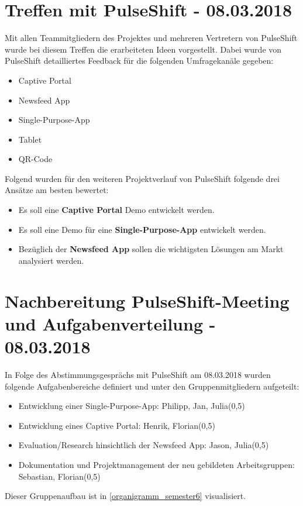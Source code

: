 \section{Treffen mit PulseShift - 08.03.2018}
\label{sec:events:definition_of_channels_for_poc}
Mit allen Teammitgliedern des Projektes und mehreren Vertretern von PulseShift wurde bei diesem Treffen die erarbeiteten Ideen vorgestellt. Dabei wurde von PulseShift detailliertes Feedback für die folgenden Umfragekanäle gegeben:
\begin{itemize}
\item Captive Portal
\item Newsfeed App
\item Single-Purpose-App
\item Tablet
\item QR-Code
\end{itemize}
Folgend wurden für den weiteren Projektverlauf von PulseShift folgende drei Ansätze am besten bewertet:
\begin{itemize}
\item Es soll eine \textbf{Captive Portal} Demo entwickelt werden.
\item Es soll eine Demo für eine \textbf{Single-Purpose-App} entwickelt werden.
\item Bezüglich der \textbf{Newsfeed App}  sollen die wichtigsten Lösungen am Markt analysiert werden.
\end{itemize}

\section{Nachbereitung PulseShift-Meeting und Aufgabenverteilung - 08.03.2018}
In Folge des Abstimmungsgesprächs mit PulseShift am 08.03.2018 wurden folgende Aufgabenbereiche definiert und unter den Gruppenmitgliedern aufgeteilt:
\begin{itemize}
\item Entwicklung einer Single-Purpose-App: Philipp, Jan, Julia(0,5)
\item Entwicklung eines Captive Portal: Henrik, Florian(0,5)
\item Evaluation/Research hinsichtlich der Newsfeed App: Jason, Julia(0,5)
\item Dokumentation und Projektmanagement der neu gebildeten Arbeitsgruppen: Sebastian, Florian(0,5)
\end{itemize}
Dieser Gruppenaufbau ist in \vref{organigramm_semester6} visualisiert.

